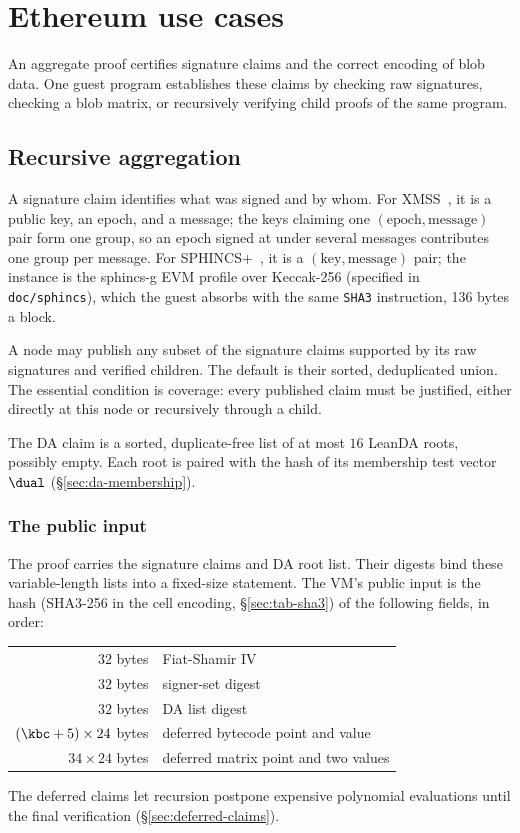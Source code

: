 \section{Ethereum use cases}\label{sec:ethereum}

An aggregate proof certifies signature claims and the correct encoding of blob data. One guest program establishes these claims by checking raw signatures, checking a blob matrix, or recursively verifying child proofs of the same program.

\subsection{Recursive aggregation}\label{sec:recursion}\label{sec:xmss-agg}\label{sec:sphincs-agg}

A signature claim identifies what was signed and by whom. For XMSS~\cite{rfc8391}, it is a public key, an epoch, and a message; the keys claiming one $(\text{epoch},\text{message})$ pair form one group, so an epoch signed at under several messages contributes one group per message. For SPHINCS+~\cite{sphincs}, it is a $(\text{key},\text{message})$ pair; the instance is the sphincs-g EVM profile over Keccak-256 (specified in \texttt{doc/sphincs}), which the guest absorbs with the same \texttt{SHA3} instruction, 136 bytes a block.

A node may publish any subset of the signature claims supported by its raw signatures and verified children. The default is their sorted, deduplicated union. The essential condition is coverage: every published claim must be justified, either directly at this node or recursively through a child.

The DA claim is a sorted, duplicate-free list of at most $16$ LeanDA roots, possibly empty. Each root is paired with the hash of its membership test vector $\dual$ (\S\ref{sec:da-membership}). 

\subsubsection{The public input}\label{sec:rec-stmt}

The proof carries the signature claims and DA root list. Their digests bind these variable-length lists into a fixed-size statement. The VM's public input is the hash (SHA3-256 in the cell encoding, \S\ref{sec:tab-sha3}) of the following fields, in order:
\begin{center}
\begin{tabular}{@{}rl@{}}
\hline
$32$ bytes & Fiat-Shamir IV\\
$32$ bytes & signer-set digest\\
$32$ bytes & DA list digest\\
$(\kbc+5)\times24$ bytes & deferred bytecode point and value\\
$34\times24$ bytes & deferred matrix point and two values\\
\hline
\end{tabular}
\end{center}
The deferred claims let recursion postpone expensive polynomial evaluations until the final verification (\S\ref{sec:deferred-claims}).


